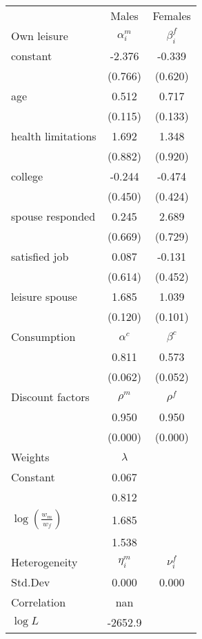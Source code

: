 \begin{tabular}{lcc} 
\hline\hline 
 & Males & Females \\ 
Own leisure & $\alpha_{i}^{m}$ & $\beta_{i}^{f}$ \\ 
constant & -2.376 & -0.339 \\ 
 & (0.766) & (0.620) \\ 
age & 0.512 & 0.717 \\ 
 & (0.115) & (0.133) \\ 
health limitations & 1.692 & 1.348 \\ 
 & (0.882) & (0.920) \\ 
college & -0.244 & -0.474 \\ 
 & (0.450) & (0.424) \\ 
spouse responded & 0.245 & 2.689 \\ 
 & (0.669) & (0.729) \\ 
satisfied job & 0.087 & -0.131 \\ 
 & (0.614) & (0.452) \\ 
leisure spouse & 1.685 & 1.039 \\ 
 & (0.120) & (0.101) \\ 
Consumption & $\alpha^{c}$ & $\beta^{c}$ \\ 
 & 0.811 & 0.573 \\ 
 & (0.062) & (0.052) \\ 
Discount factors & $\rho^m$ & $\rho^f$ \\ 
 & 0.950 & 0.950 \\ 
 & (0.000) & (0.000) \\ 
Weights & $\lambda$ &  \\ 
Constant & 0.067 &  \\ 
 & 0.812 &  \\ 
$\log(\frac{w_m}{w_f})$ & 1.685 &  \\ 
 & 1.538 &  \\ 
Heterogeneity & $\eta_i^m$ & $\nu_i^f$ \\ 
Std.Dev & 0.000 & 0.000 \\ 
Correlation & nan &  \\ 
\hline 
$\log L$ & -2652.9 & \\ 
\hline \hline 
\end{tabular} 
